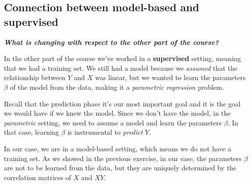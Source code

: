 \subsection{Connection between model-based and supervised}
\textbf{\textit{What is changing with respect to the other part of the course?}}

In the other part of the course we've worked in a \textbf{supervised} setting, meaning that we had a training set. We still had a model because we \textit{assumed} that the relationship between $Y$ and $X$ was linear, but we wanted to learn the parameters $\beta$ of the model from the data, making it a \textit{parametric regression} problem.

Recall that the prediction phase it's our most important goal and it is the goal we would have if we knew the model. Since we don't have the model, in the \textit{parametric} setting, we need to assume a model and learn the parameters $\beta$. In that case, learning $\beta$ is instrumental to \textit{predict} $Y$.

In our case, we are in a model-based setting, which means we do not have a training set. As we showed in the previous exercise, in our case, the parameters $\beta$ are not to be learned from the data, but they are uniquely determined by the correlation matrices of $X$ and $XY$.


%
%

